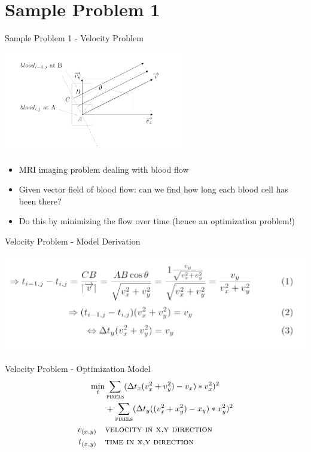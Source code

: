 \documentclass[presentation]{beamer}
\begin{document}
\section{Sample Problem 1}
\label{sec:org94a0e83}
\begin{frame}[label={sec:org802260d}]{Sample Problem 1 - Velocity Problem}
\begin{center}
\includegraphics[width=8cm]{figs/velocity.png}
\end{center}
\begin{itemize}
\item MRI imaging problem dealing with blood flow
\item Given vector field of blood flow: can we find how long each blood cell has been there?
\item Do this by minimizing the \alert{flow} over time (hence an optimization problem!)
\end{itemize}
\end{frame}

\begin{frame}[label={sec:org03d5ffb}]{Velocity Problem - Model Derivation}
\begin{center}
\includegraphics[width=.9\linewidth]{figs/velocityderivation.png}
\end{center}
\end{frame}
\begin{frame}[label={sec:org06e74f7}]{Velocity Problem - Optimization Model}
\begin{align*}
\min_t &\sum_{\textsc{pixels}} (\Delta t_x (v_x^2 + v_y^2) - v_x) * v_x^2)^2  \\
               & + \sum_{\textsc{pixels}} (\Delta t_y ((v_x^2 + x_y^2) - x_y) * x_y^2)^2 \\
v_{(x,y)} \quad & \textsc{velocity in x,y direction} \\
t_{(x,y)} \quad & \textsc{time in x,y direction}
\end{align*}
\end{frame}
\end{document}
